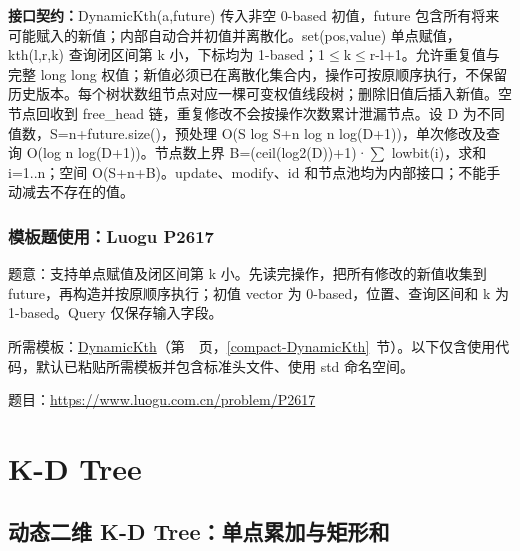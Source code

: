 {\sloppy{}\noindent\textbf{接口契约：}DynamicKth(a,future) 传入非空 0-based 初值，future 包含所有将来可能赋入的新值；内部自动合并初值并离散化。set(pos,value) 单点赋值，kth(l,r,k) 查询闭区间第 k 小，下标均为 1-based；1$\le$k$\le$r-l+1。允许重复值与完整 long long 权值；新值必须已在离散化集合内，操作可按原顺序执行，不保留历史版本。每个树状数组节点对应一棵可变权值线段树；删除旧值后插入新值。空节点回收到 free\_head 链，重复修改不会按操作次数累计泄漏节点。设 D 为不同值数，S=n+future.size()，预处理 O(S log S+n log n log(D+1))，单次修改及查询 O(log n log(D+1))。节点数上界 B=(ceil(log2(D))+1)·$\sum$ lowbit(i)，求和 i=1..n；空间 O(S+n+B)。update、modify、id 和节点池均为内部接口；不能手动减去不存在的值。\par}



\Needspace{407pt}



\Needspace{572pt}

\subsection*{模板题使用：Luogu P2617}

\label{usage-example-63}

题意：支持单点赋值及闭区间第 k 小。先读完操作，把所有修改的新值收集到 future，再构造并按原顺序执行；初值 vector 为 0-based，位置、查询区间和 k 为 1-based。Query 仅保存输入字段。

所需模板：\hyperref[compact-DynamicKth]{DynamicKth}（第~\pageref{compact-DynamicKth}~页，\ref{compact-DynamicKth}~节）。以下仅含使用代码，默认已粘贴所需模板并包含标准头文件、使用 std 命名空间。

题目：\url{https://www.luogu.com.cn/problem/P2617}



\Needspace{180pt}

\chapter{K-D Tree}

\section{动态二维 K-D Tree：单点累加与矩形和}\label{compact-KDTreeSum}

